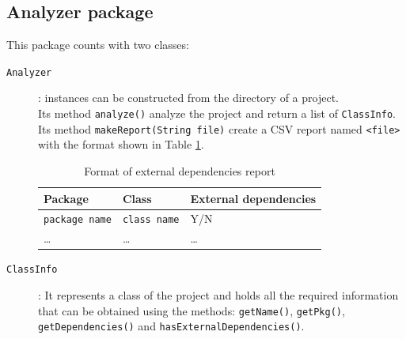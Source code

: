 \documentclass[11pt, a4paper, twocolumn]{article}
\begin{document}
\subsection{Analyzer package}
This package counts with two classes:
\begin{description}
\item[\texttt{Analyzer}]: instances can be constructed from the directory of a project.\\
Its method \texttt{analyze()} analyze the project and return a list of \texttt{ClassInfo}.\\
Its method \texttt{makeReport(String file)} create a CSV report named \verb+<file>+ with the format shown in Table \ref{table:external}.

\begin{table}[b] \centering
\begin{tabular}{ | m{4.5em} | m{4.5em}| m{6em} |}
\hline Package & Class & External dependencies \\ 
\hline \texttt{package name} & \texttt{class name} & Y/N\\
\hline \ldots & \ldots & \ldots \\
\hline
\end{tabular}
\caption{Format of external dependencies report}
\label{table:external}
\end{table}

\item[\texttt{ClassInfo}]: It represents a class of the project and holds all the required information that can be obtained using the methods: \texttt{getName()}, \texttt{getPkg()}, \texttt{getDependencies()} and \texttt{hasExternalDependencies()}.
\end{description}
\end{document}
